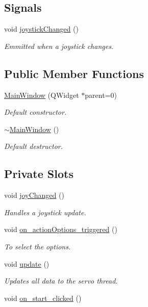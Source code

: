 \subsection*{Signals}
\begin{DoxyCompactItemize}
\item 
void \hyperlink{class_main_window_ac85ba5aec3be2a51a348ff669b9dc842}{joystick\+Changed} ()
\begin{DoxyCompactList}\small\item\em Emmitted when a joystick changes. \end{DoxyCompactList}\end{DoxyCompactItemize}
\subsection*{Public Member Functions}
\begin{DoxyCompactItemize}
\item 
\hyperlink{class_main_window_a8b244be8b7b7db1b08de2a2acb9409db}{Main\+Window} (Q\+Widget $\ast$parent=0)
\begin{DoxyCompactList}\small\item\em Default constructor. \end{DoxyCompactList}\item 
\hyperlink{class_main_window_ae98d00a93bc118200eeef9f9bba1dba7}{$\sim$\+Main\+Window} ()
\begin{DoxyCompactList}\small\item\em Default destructor. \end{DoxyCompactList}\end{DoxyCompactItemize}
\subsection*{Private Slots}
\begin{DoxyCompactItemize}
\item 
void \hyperlink{class_main_window_abb4c2d8a79c9f80010ea031366bf8226}{joy\+Changed} ()
\begin{DoxyCompactList}\small\item\em Handles a joystick update. \end{DoxyCompactList}\item 
void \hyperlink{class_main_window_a1dd57ccb62bc6f5a361aba6e088dd2e1}{on\+\_\+action\+Options\+\_\+triggered} ()
\begin{DoxyCompactList}\small\item\em To select the options. \end{DoxyCompactList}\item 
void \hyperlink{class_main_window_a128f71880d4b9683149023fc46fcc9f8}{update} ()
\begin{DoxyCompactList}\small\item\em Updates all data to the servo thread. \end{DoxyCompactList}\item 
void \hyperlink{class_main_window_ae66e9ab15f911b93fce0f161d2fde880}{on\+\_\+start\+\_\+clicked} ()
\end{DoxyCompactItemize}
